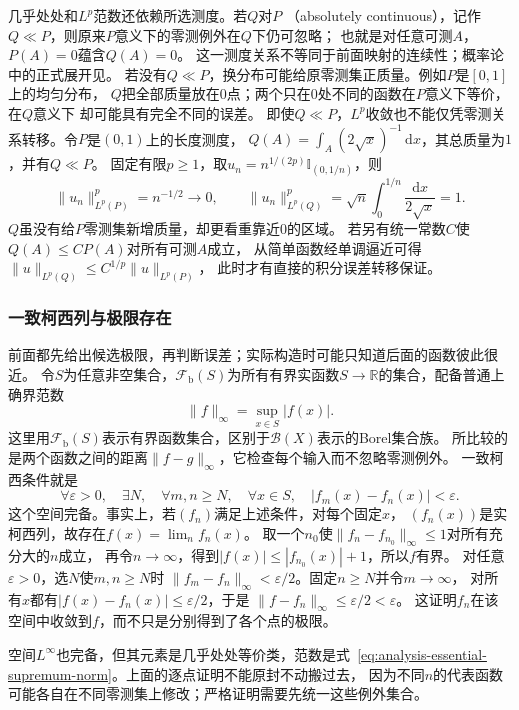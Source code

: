 几乎处处和$L^p$范数还依赖所选测度。若$Q$对$P$
（absolutely continuous），记作$Q\ll P$，则原来$P$意义下的零测例外在$Q$下仍可忽略；
也就是对任意可测$A$，$P(A)=0$蕴含$Q(A)=0$。
这一测度关系不等同于前面映射的连续性；概率论中的正式展开见。
若没有$Q\ll P$，换分布可能给原零测集正质量。例如$P$是$[0,1]$上的均匀分布，
$Q$把全部质量放在$0$点；两个只在$0$处不同的函数在$P$意义下等价，在$Q$意义下
却可能具有完全不同的误差。
即使$Q\ll P$，$L^p$收敛也不能仅凭零测关系转移。令$P$是$(0,1)$上的长度测度，
$Q(A)=\int_A(2\sqrt x)^{-1}\,\mathrm dx$，其总质量为$1$，并有$Q\ll P$。
固定有限$p\geq1$，取$u_n=n^{1/(2p)}\mathbb I_{(0,1/n)}$，则
\[
 \lVert u_n\rVert_{L^p(P)}^p=n^{-1/2}\to0,\qquad
 \lVert u_n\rVert_{L^p(Q)}^p
 =\sqrt n\int_0^{1/n}\frac{\mathrm dx}{2\sqrt x}=1.
\]
$Q$虽没有给$P$零测集新增质量，却更看重靠近$0$的区域。
若另有统一常数$C$使$Q(A)\leq CP(A)$对所有可测$A$成立，
从简单函数经单调逼近可得$\lVert u\rVert_{L^p(Q)}
\leq C^{1/p}\lVert u\rVert_{L^p(P)}$，
此时才有直接的积分误差转移保证。

\subsubsection{一致柯西列与极限存在}
前面都先给出候选极限，再判断误差；实际构造时可能只知道后面的函数彼此很近。
令$S$为任意非空集合，$\mathcal F_{\mathrm b}(S)$为所有有界实函数$S\to\mathbb{R}$的集合，配备普通上确界范数
\[   \lVert f\rVert_{\infty}   =   \sup_{x\in S}|f(x)|. \]
这里用$\mathcal F_{\mathrm b}(S)$表示有界函数集合，区别于$\mathcal B(X)$表示的Borel集合族。
所比较的是两个函数之间的距离$\lVert f-g\rVert_\infty$，它检查每个输入而不忽略零测例外。
一致柯西条件就是
\[
 \forall\varepsilon>0,\quad\exists N,\quad
 \forall m,n\geq N,\quad\forall x\in S,\quad
 |f_m(x)-f_n(x)|<\varepsilon.
\]
这个空间完备。事实上，若$(f_n)$满足上述条件，对每个固定$x$，
$(f_n(x))$是实柯西列，故存在$f(x)=\lim_n f_n(x)$。
取一个$n_0$使$\lVert f_n-f_{n_0}\rVert_\infty\leq1$对所有充分大的$n$成立，
再令$n\to\infty$，得到$|f(x)|\leq|f_{n_0}(x)|+1$，所以$f$有界。
对任意$\varepsilon>0$，选$N$使$m,n\geq N$时
$\lVert f_m-f_n\rVert_\infty<\varepsilon/2$。固定$n\geq N$并令$m\to\infty$，
对所有$x$都有$|f(x)-f_n(x)|\leq\varepsilon/2$，于是
$\lVert f-f_n\rVert_\infty\leq\varepsilon/2<\varepsilon$。
这证明$f_n$在该空间中收敛到$f$，而不只是分别得到了各个点的极限。

空间$L^\infty$也完备，但其元素是几乎处处等价类，范数是式~\eqref{eq:analysis-essential-supremum-norm}。上面的逐点证明不能原封不动搬过去， 因为不同$n$的代表函数可能各自在不同零测集上修改；严格证明需要先统一这些例外集合。


